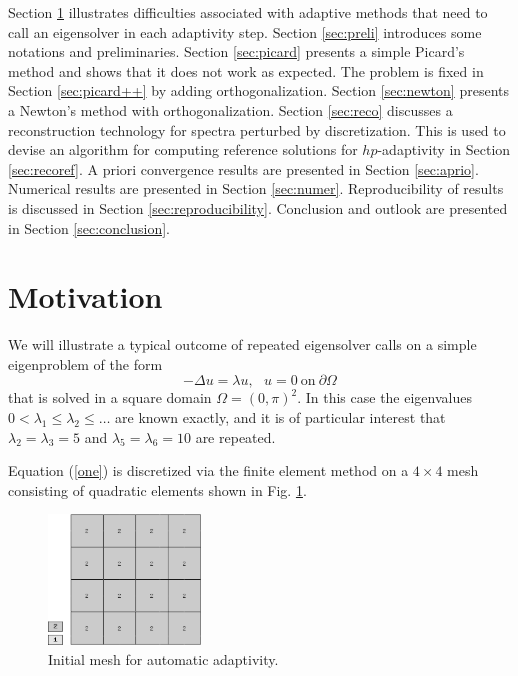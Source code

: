 \documentclass[preprint,12pt]{elsarticle}
\begin{document}
Section \ref{sec:motiv} illustrates difficulties associated with 
adaptive methods that need to call an eigensolver in each adaptivity 
step. Section \ref{sec:preli} introduces some notations and 
preliminaries. Section \ref{sec:picard} presents a simple
Picard's method and shows that it does not work as expected.
The problem is fixed in Section \ref{sec:picard++} by adding 
orthogonalization. Section \ref{sec:newton} presents 
a Newton's method with orthogonalization. Section \ref{sec:reco}
discusses a reconstruction technology for spectra perturbed 
by discretization. This is used to devise an algorithm for 
computing reference solutions for $hp$-adaptivity in 
Section \ref{sec:recoref}. A priori convergence results 
are presented in Section \ref{sec:aprio}. Numerical results 
are presented in Section \ref{sec:numer}. Reproducibility of 
results is discussed in Section \ref{sec:reproducibility}.
Conclusion and outlook are presented in Section \ref{sec:conclusion}.


\section{Motivation}\label{sec:motiv}

We will illustrate a typical outcome of repeated eigensolver calls
on a simple eigenproblem of the form 
\begin{equation} \label{one}
-\Delta u = \lambda u, \ \ \ u = 0 \ \mbox{on} \ \partial \Omega
\end{equation}
that is solved in a square domain $\Omega = (0, \pi)^2$.
In this case the eigenvalues $0 < \lambda_1 \le \lambda_2 \le \ldots$ 
are known exactly, and it is of particular interest that $\lambda_2 = \lambda_3 = 5$ 
and $\lambda_5 = \lambda_6 = 10$ are repeated. 

Equation (\ref{one}) is discretized via the finite element method
on a $4\times 4$ mesh consisting of quadratic elements shown in Fig. \ref{fig:mesh1}.\\

\begin{figure}[!ht]
\begin{center}
\includegraphics[width=0.36\textwidth]{img/mesh_1.png}
\end{center}
\vspace{-5mm}
\caption{Initial mesh for automatic adaptivity.}
\label{fig:mesh1}
\end{figure}
\end{document}
